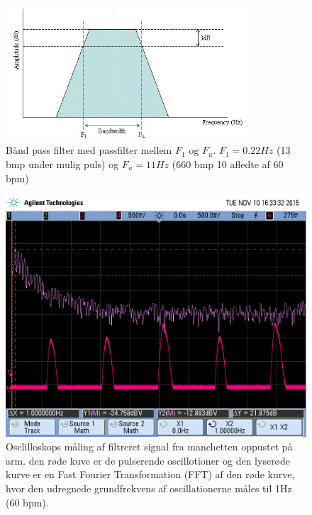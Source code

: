 \begin{figure}[H]
	\centering
	\includegraphics[trim={0 0 0 1.5cm},clip, width=0.8\textwidth]{billeder/BandPass_filter.JPG}
	\caption{Bånd pass filter med passfilter mellem $F_1$ og $F_u$. $F_1=0.22Hz$ (13 bmp under mulig puls) og $F_u=11Hz$ (660 bmp 10 afledte af 60 bpm) }\label{fig:BandPassFilter}
\end{figure}

\begin{figure}[H]
	\centering
	\includegraphics[trim={0 0 0 1.5cm},clip, width=1\textwidth]{billeder/filteredPulseSignalWithFFT.png}
	\caption{Osclilloskops måling af filtreret signal fra manchetten oppustet på arm. den røde kuve er de pulserende oscillotioner og den lyserøde kurve er en Fast Fourier Transformation (FFT) af den røde kurve, hvor den udregnede grundfrekvens af oscillationerne måles til 1Hz (60 bpm).}\label{fig:filteredPulseSignalWithFFT}
\end{figure}

